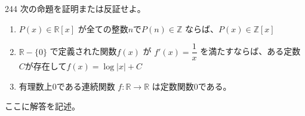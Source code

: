 \begin{prob}{244}{}{}
 次の命題を証明または反証せよ。
 \begin{enumerate}
  \item $P(x)\in\mathbb{R}[x]$ が全ての整数$n$で$P(n)\in\mathbb{Z}$ ならば、$P(x)\in\mathbb{Z}[x]$
  \item $\mathbb{R}-\{0\}$ で定義された関数$f(x)$ が $f'(x)=\dfrac{1}{x}$ を満たすならば、ある定数$C$が存在して$f(x)=\log |x|+C$
  \item 有理数上0である連続関数 $f:\mathbb{R}\rightarrow\mathbb{R}$ は定数関数0である。
 \end{enumerate}
\end{prob}
ここに解答を記述。